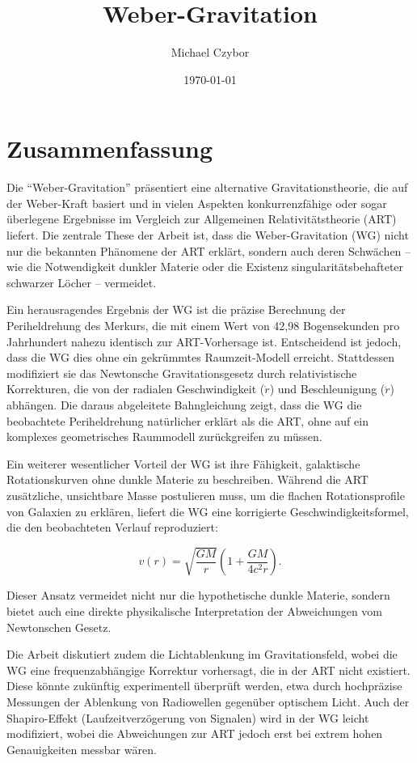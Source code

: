 \documentclass{book}
\numberwithin{equation}{section}
\begin{document}
\title{Weber-Gravitation}
\author{Michael Czybor}
\date{\today}
\maketitle

\section*{Zusammenfassung}
Die \enquote{Weber-Gravitation} präsentiert eine alternative Gravitationstheorie, die auf der Weber-Kraft basiert und in vielen Aspekten konkurrenzfähige
oder sogar überlegene Ergebnisse im Vergleich zur Allgemeinen Relativitätstheorie \cite{einstein1915} (ART) liefert. Die zentrale These der Arbeit ist, dass die
Weber-Gravitation (WG) nicht nur die bekannten Phänomene der ART erklärt, sondern auch deren Schwächen – wie die Notwendigkeit dunkler Materie
oder die Existenz singularitätsbehafteter schwarzer Löcher – vermeidet.

Ein herausragendes Ergebnis der WG ist die präzise Berechnung der Periheldrehung des Merkurs, die mit einem Wert von 42,98 Bogensekunden pro Jahrhundert
nahezu identisch zur ART-Vorhersage ist. Entscheidend ist jedoch, dass die WG dies ohne ein gekrümmtes Raumzeit-Modell erreicht. Stattdessen modifiziert
sie das Newtonsche Gravitationsgesetz durch relativistische Korrekturen, die von der radialen Geschwindigkeit (\(\dot{r}\)) und Beschleunigung (\(\ddot{r}\)) abhängen.
Die daraus abgeleitete Bahngleichung zeigt, dass die WG die beobachtete Periheldrehung natürlicher erklärt als die ART, ohne auf ein komplexes geometrisches
Raummodell zurückgreifen zu müssen.

Ein weiterer wesentlicher Vorteil der WG ist ihre Fähigkeit, galaktische Rotationskurven ohne dunkle Materie zu beschreiben. Während die ART zusätzliche,
unsichtbare Masse postulieren muss, um die flachen Rotationsprofile von Galaxien zu erklären, liefert die WG eine korrigierte Geschwindigkeitsformel,
die den beobachteten Verlauf reproduziert:  

\[
v(r) = \sqrt{\frac{GM}{r}} \left(1 + \frac{GM}{4c^2r}\right).
\]  

Dieser Ansatz vermeidet nicht nur die hypothetische dunkle Materie, sondern bietet auch eine direkte physikalische Interpretation der Abweichungen vom Newtonschen Gesetz.

Die Arbeit diskutiert zudem die Lichtablenkung im Gravitationsfeld, wobei die WG eine frequenzabhängige Korrektur vorhersagt, die in der ART nicht existiert.
Diese könnte zukünftig experimentell überprüft werden, etwa durch hochpräzise Messungen der Ablenkung von Radiowellen gegenüber optischem Licht. Auch der
Shapiro-Effekt \cite{shapiro1964} (Laufzeitverzögerung von Signalen) wird in der WG leicht modifiziert, wobei die Abweichungen zur ART jedoch erst bei extrem hohen Genauigkeiten messbar wären.  
\end{document}
